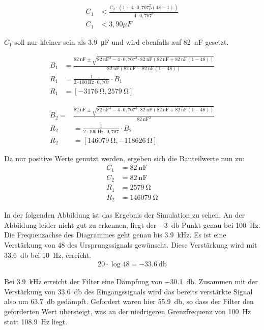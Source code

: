 \begin{align*}
C_1&<\frac{C_2\cdot(1+4\cdot0,707^2_P(48-1))}{4\cdot0,707^2}\\
C_1&<3,90\mu F
\end{align*}

$C_1$ soll nur kleiner sein als \SI{3,9}{\micro\farad} und wird ebenfalls auf \SI{82}{\nano\farad} gesetzt.

\begin{align*}
B_1&=\frac{\SI{82}{\nano\farad}\pm\sqrt{\SI{82}{\nano\farad}^2-4\cdot0,707^2\cdot\SI{82}{\nano\farad}(\SI{82}{\nano\farad}+\SI{82}{\nano\farad}(1-48))}}{\SI{82}{\nano\farad}(\SI{82}{\nano\farad}-\SI{82}{\nano\farad}(1-48))}\\
R_1&=\frac{1}{2\cdot\SI{100}{\hertz}\cdot0,707} \cdot B_1\\
R_1&=[\SI{-3176}{\ohm},\SI{2579}{\ohm}]
\end{align*}


\begin{align*}
B_2=&\frac{\SI{82}{\nano\farad}\pm\sqrt{\SI{82}{\nano\farad}^2-4\cdot0,707^2\cdot\SI{82}{\nano\farad}(\SI{82}{\nano\farad}+\SI{82}{\nano\farad}(1-48))}}{\SI{82}{\nano\farad}^2}\\
R_2&=\frac{1}{2\cdot\SI{100}{\hertz}\cdot0,707} \cdot B_2\\
R_2&=[\SI{146079}{\ohm},\SI{-118626}{\ohm}]
\end{align*}

Da nur positive Werte genutzt werden, ergeben sich die Bauteilwerte nun zu:
\begin{align*}
C_1&=\SI{82}{\nano\farad}\\
C_2&=\SI{82}{\nano\farad}\\
R_1&=\SI{2579}{\ohm}\\
R_2&=\SI{146079}{\ohm}
\end{align*}

In der folgenden Abbildung ist das Ergebnis der Simulation zu sehen. An der Abbildung leider nicht gut zu erkennen,
liegt der \SI{-3}{\decibel} Punkt genau bei \SI{100}{\hertz}. Die Frequenzachse des Diagrammes geht genau bis \SI{3,9}{\kilo\hertz}. 
Es ist eine Verstärkung von 48 des Ursprungssignals gewünscht. Diese Verstärkung wird mit \SI{33,6}{\decibel} bei \SI{10}{\hertz}, erreicht.
\begin{align*}
20\cdot\log{48}=\SI{-33,6}{\decibel}
\end{align*}

Bei \SI{3,9}{\kilo\hertz} erreicht der Filter eine Dämpfung von \SI{-30,1}{\decibel}. Zusammen mit der Verstärkung von \SI{33,6}{\decibel} des Eingangssignals 
wird das bereits verstärkte Signal also um \SI{63,7}{\decibel} gedämpft. Gefordert waren hier \SI{55,9}{\decibel}, so dass der Filter den geforderten Wert übersteigt, was an der niedrigeren Grenzfrequenz von \SI{100}{\hertz} statt \SI{108,9}{\hertz} liegt.

